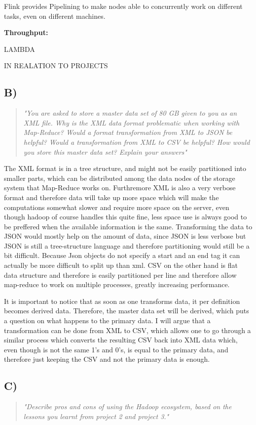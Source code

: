 Flink provides Pipelining to make nodes able to concurrently work on different tasks, even on different machines.

\newpar \textbf{Throughput:} 

\newpar LAMBDA

\newpar IN REALATION TO PROJECTS
\subsection{B)}
\begin{quote}
		\textit{"You	are	asked	to	store	a	master	data	set	of	80	GB	given	to	you	as	an	XML	file.	Why	is	the	XML	data	format	problematic	when	working	with	Map-Reduce?	Would	a	format	transformation	from	XML	to	JSON	be	helpful?	Would	a	transformation	from	XML	to	CSV	be	helpful?	How	would	you	store	this	master	data	set?	Explain	your	answers"}
\end{quote}
The XML format is in a tree structure, and might not be easily partitioned into smaller parts, which can be distributed among the data nodes of the storage system that Map-Reduce works on. Furthremore XML is also a very verbose format and therefore data will take up more space which will make the computations somewhat slower and require more space on the server, even though hadoop of course handles this quite fine, less space use is always good to be preffered when the available information is the same. Transforming the data to JSON would mostly help on the amount of data, since JSON is less verbose but JSON is still a tree-structure language and therefore partitioning would still be a bit difficult. Because Json objects do not specify a start and an end tag it can actually be more difficult to split up than xml. CSV on the other hand is flat data structure and therefore is easily partitioned per line and therefore allow map-reduce to work on multiple processes, greatly increasing performance. 

It is important to notice that as soon as one transforms data, it per definition becomes derived data. Therefore, the master data set will be derived, which puts a question on what happens to the primary data. I will argue that a transformation can be done from XML to CSV, which allows one to go through a similar process which converts the resulting CSV back into XML data which, even though is not the same 1's and 0's, is equal to the primary data, and therefore just keeping the CSV and not the primary data is enough.

\subsection{C)}
\begin{quote}
	\textit{"Describe	pros	and	cons	of	using	the	Hadoop	ecosystem,	based	on	the	lessons	you	learnt	from	project	2	and	project	3."}
\end{quote}

